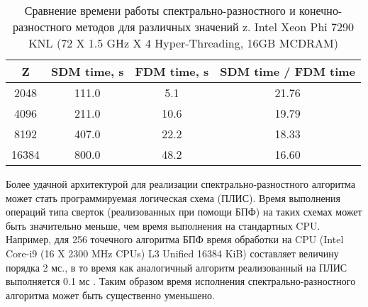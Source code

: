 \begin{center}
\begin{table}[h!]
\centering
  \begin{tabular}{|c|c|c|c|}
   \hline
	\textbf{Z} &  \textbf{SDM time, s} & \textbf{FDM time, s} & \textbf{SDM time / FDM time} \\
	\hline
	2048 &  111.0 & 5.1 & 21.76 \\
	\hline
	4096 &  211.0 & 10.6 & 19.79 \\
	\hline
	8192 &  407.0 & 22.2 & 18.33 \\
	\hline
	16384 &  800.0 & 48.2 & 16.60 \\
  \hline 
  \end{tabular}
  \captionsetup{justification=centering}
  \caption{Сравнение времени работы спектрально-разностного и конечно-разностного методов для различных значений z. Intel Xeon Phi 7290 KNL (72 X 1.5 GHz X 4 Hyper-Threading, 16GB MCDRAM)}\label{table4}
\end{table}
\end{center}

Более удачной архитектурой для реализации спектрально-разностного алгоритма может стать программируемая логическая схема (ПЛИС).
Время выполнения операций типа сверток (реализованных при помощи БПФ) на таких схемах может быть значительно меньше,
чем время выполнения на стандартных CPU. Например, для 256 точечного алгоритма БПФ время обработки на CPU (Intel Core-i9 (16 X 2300 MHz CPUs) L3 Unified 16384 KiB) составляет величину порядка 2 мс., в то время как аналогичный алгоритм реализованный на ПЛИС выполняется 0.1 мс \cite{ivan}.
Таким образом время исполнения спектрально-разностного алгоритма может быть существенно уменьшено.

\clearpage
